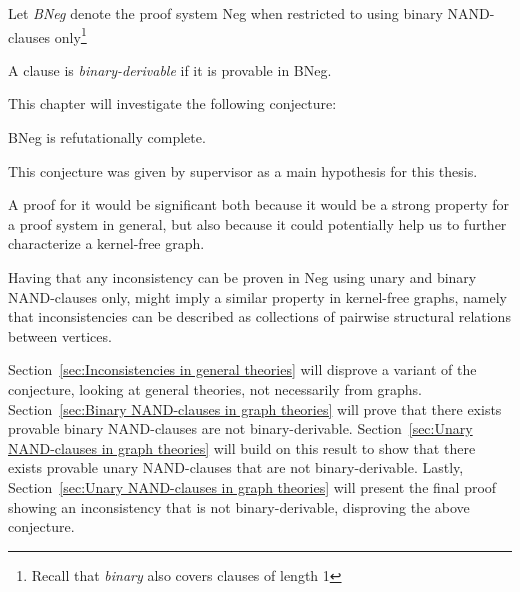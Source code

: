 

\begin{definition}
   Let \textit{BNeg} denote the proof system Neg when restricted to using binary NAND-clauses only\footnote{Recall that \textit{binary} also covers clauses of length 1}
\end{definition}
\begin{definition}
  A clause is \textit{binary-derivable} if it is provable in BNeg.
\end{definition}
This chapter will investigate the following conjecture:
\begin{conjecture}
  BNeg is refutationally complete.
  \label{thm:Neg2_ref_complete}
\end{conjecture}
This conjecture was given by supervisor as a main hypothesis for this thesis.

A proof for it would be significant both because it would be a strong property for a proof system in general, but also because it could potentially help us to further characterize a kernel-free graph.

Having that any inconsistency can be proven in Neg using unary and binary NAND-clauses only, might imply a similar property in kernel-free graphs, namely that inconsistencies can be described as collections of pairwise structural relations between vertices.

Section~\ref{sec:Inconsistencies in general theories} will disprove a variant of the conjecture, looking at general theories, not necessarily from graphs.
Section~\ref{sec:Binary NAND-clauses in graph theories} will prove that there exists provable binary NAND-clauses are not binary-derivable.
Section~\ref{sec:Unary NAND-clauses in graph theories} will build on this result to show that there exists provable unary NAND-clauses that are not binary-derivable.
Lastly, Section~\ref{sec:Unary NAND-clauses in graph theories} will present the final proof showing an inconsistency that is not binary-derivable, disproving the above conjecture. 
